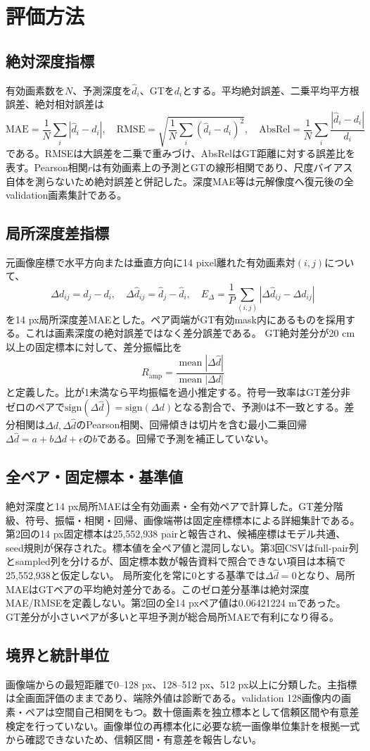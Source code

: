 \chapter{評価方法}
\section{絶対深度指標}
有効画素数を$N$、予測深度を$\hat d_i$、GTを$d_i$とする。平均絶対誤差、二乗平均平方根誤差、絶対相対誤差は
\[
\mathrm{MAE}=\frac1N\sum_i|\hat d_i-d_i|,\quad
\mathrm{RMSE}=\sqrt{\frac1N\sum_i(\hat d_i-d_i)^2},\quad
\mathrm{AbsRel}=\frac1N\sum_i\frac{|\hat d_i-d_i|}{d_i}
\]
である。RMSEは大誤差を二乗で重みづけ、AbsRelはGT距離に対する誤差比を表す。Pearson相関$r$は有効画素上の予測とGTの線形相関であり、尺度バイアス自体を測らないため絶対誤差と併記した。深度MAE等は元解像度へ復元後の全validation画素集計である。
\section{局所深度差指標}
元画像座標で水平方向または垂直方向に14 pixel離れた有効画素対$(i,j)$について、
\[
\Delta d_{ij}=d_j-d_i,\quad \Delta\hat d_{ij}=\hat d_j-\hat d_i,\quad
E_\Delta=\frac1P\sum_{(i,j)}|\Delta\hat d_{ij}-\Delta d_{ij}|
\]
を14 px局所深度差MAEとした。ペア両端がGT有効mask内にあるものを採用する。これは画素深度の絶対誤差ではなく差分誤差である。
GT絶対差分が20 cm以上の固定標本に対して、差分振幅比を
\[
R_{\mathrm{amp}}=\frac{\operatorname{mean}|\Delta\hat d|}{\operatorname{mean}|\Delta d|}
\]
と定義した。比が1未満なら平均振幅を過小推定する。符号一致率はGT差分非ゼロのペアで$\mathrm{sign}(\Delta\hat d)=\mathrm{sign}(\Delta d)$となる割合で、予測0は不一致とする。差分相関は$\Delta d,\Delta\hat d$のPearson相関、回帰傾きは切片を含む最小二乗回帰$\Delta\hat d=a+b\Delta d+\epsilon$の$b$である。回帰で予測を補正していない。
\section{全ペア・固定標本・基準値}
絶対深度と14 px局所MAEは全有効画素・全有効ペアで計算した。GT差分階級、符号、振幅・相関・回帰、画像端帯は固定座標標本による詳細集計である。第2回の14 px固定標本は25,552,938 pairと報告され、候補座標はモデル共通、seed規則が保存された。標本値を全ペア値と混同しない。第3回CSVはfull-pair列とsampled列を分けるが、固定標本数が報告資料で照合できない項目は本稿で25,552,938と仮定しない。
局所変化を常に0とする基準では$\Delta\hat d=0$となり、局所MAEはGTペアの平均絶対差分である。このゼロ差分基準は絶対深度MAE/RMSEを定義しない。第2回の全14 pxペア値は0.06421224 mであった。GT差分が小さいペアが多いと平坦予測が総合局所MAEで有利になり得る。
\section{境界と統計単位}
画像端からの最短距離で0--128 px、128--512 px、512 px以上に分類した。主指標は全画面評価のままであり、端除外値は診断である。validation 128画像内の画素・ペアは空間自己相関をもつ。数十億画素を独立標本として信頼区間や有意差検定を行っていない。画像単位の再標本化に必要な統一画像単位集計を根拠一式から確認できないため、信頼区間・有意差を報告しない。